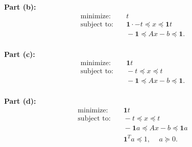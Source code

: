 \documentclass[11pt]{article}
\DeclareMathOperator{\minimize}{minimize:}
\DeclareMathOperator{\subjectto}{subject\ to:}
\begin{document}
\begin{homeworkProblem}
    \pagebreak

    \textbf{Part (b):}
    \begin{align*}
        \minimize  & \quad t                                                  \\
        \subjectto & \quad \mathbf{1} \cdot -t  \preceq x \preceq \mathbf{1}t \\
                   & \quad -\mathbf{1} \preceq Ax - b \preceq \mathbf{1}.     \\
    \end{align*}

    \textbf{Part (c):}
    \begin{align*}
        \minimize  & \quad \mathbf{1} t                                   \\
        \subjectto & \quad -t \preceq x \preceq t                         \\
                   & \quad -\mathbf{1} \preceq Ax - b \preceq \mathbf{1}. \\
    \end{align*}

    \textbf{Part (d):}
    \begin{align*}
        \minimize  & \quad \mathbf{1} t                                      \\
        \subjectto & \quad -t \preceq x \preceq t                            \\
                   & \quad -\mathbf{1} a \preceq Ax - b \preceq \mathbf{1} a \\
                   & \quad \mathbf{1}^T a \preceq 1, \, \quad a \succeq 0.   \\
    \end{align*}



\end{homeworkProblem}

\pagebreak
\end{document}
